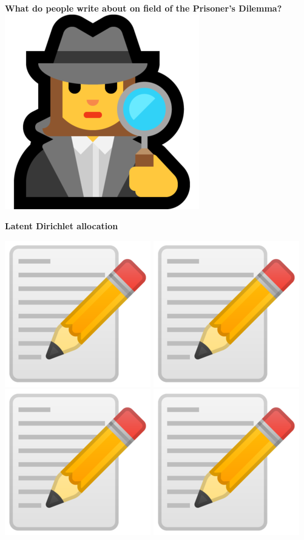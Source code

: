 \documentclass{beamer}
\begin{document}
\begin{frame}
    \begin{center}
        \Large{\textbf{What do people write about on field of the Prisoner's Dilemma?}} \\ \vspace{1cm}
        \includegraphics[width=.15\textwidth]{static/detective.png} \\ \vspace{.5cm}
    \end{center}
\end{frame}

\begin{frame}
    \begin{center}
        \Large{\textbf{Latent Dirichlet allocation}}
    \end{center}
\end{frame}

\begin{frame}
    \begin{center}
    \includegraphics[width=.10\textwidth]{static/paper.png}
    \includegraphics[width=.10\textwidth]{static/paper.png}
    \includegraphics[width=.10\textwidth]{static/paper.png}
    \includegraphics[width=.10\textwidth]{static/paper.png}
    \vspace{1cm}


    \vspace{1cm}
    \end{center}
\end{frame}
\end{document}
